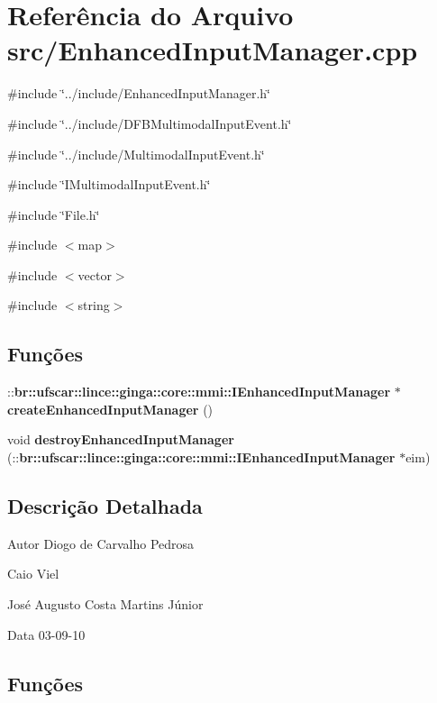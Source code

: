 \section{Referência do Arquivo src/EnhancedInputManager.cpp}
\label{EnhancedInputManager_8cpp}
{\ttfamily \#include \char`\"{}../include/EnhancedInputManager.h\char`\"{}}\par
{\ttfamily \#include \char`\"{}../include/DFBMultimodalInputEvent.h\char`\"{}}\par
{\ttfamily \#include \char`\"{}../include/MultimodalInputEvent.h\char`\"{}}\par
{\ttfamily \#include \char`\"{}IMultimodalInputEvent.h\char`\"{}}\par
{\ttfamily \#include \char`\"{}File.h\char`\"{}}\par
{\ttfamily \#include $<$map$>$}\par
{\ttfamily \#include $<$vector$>$}\par
{\ttfamily \#include $<$string$>$}\par
\subsection*{Funções}
\begin{DoxyCompactItemize}
\item 
::{\bf br::ufscar::lince::ginga::core::mmi::IEnhancedInputManager} $\ast$ {\bf createEnhancedInputManager} ()
\item 
void {\bf destroyEnhancedInputManager} (::{\bf br::ufscar::lince::ginga::core::mmi::IEnhancedInputManager} $\ast$eim)
\end{DoxyCompactItemize}


\subsection{Descrição Detalhada}
\begin{DoxyAuthor}{Autor}
Diogo de Carvalho Pedrosa 

Caio Viel 

José Augusto Costa Martins Júnior 
\end{DoxyAuthor}
\begin{DoxyDate}{Data}
03-\/09-\/10 
\end{DoxyDate}


\subsection{Funções}
